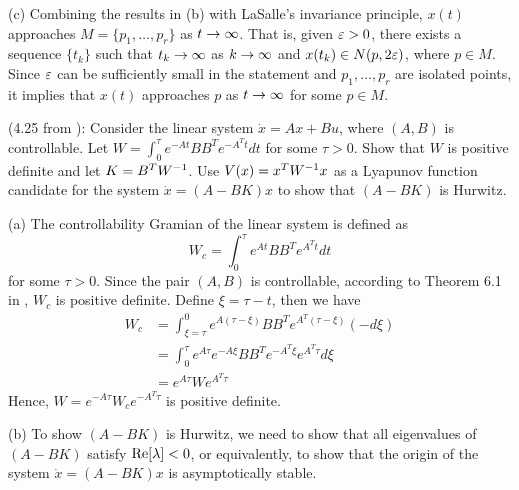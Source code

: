 \documentclass[a4 paper, 12pt]{article}
\begin{document}
(c) Combining the results in (b) with LaSalle's invariance principle, $x(t)$ approaches $M=\{p_1,\dots,p_r\}$ as $t\rightarrow\infty$. That is, given $\varepsilon>0$, there exists a sequence $\{t_k\}$ such that $t_k\rightarrow\infty$ as $k\rightarrow\infty$ and $x(t_k) \in N(p,2\varepsilon)$, where $p \in M$. Since $\varepsilon$ can be sufficiently small in the statement and $p_1,\dots,p_r$ are isolated points, it implies that $x(t)$ approaches $p$ as $t\rightarrow\infty$ for some $p\in M$.



\vspace{3em}
(4.25 from \cite{c1}): Consider the linear system $\dot{x} = Ax+Bu$, where $(A,B)$ is controllable. Let $W = \int_0^\tau e^{-At}BB^Te^{-A^Tt}dt$ for some $\tau>0$. Show that $W$ is positive definite and let $K = B^TW^{-1}$. Use $V(x) = x^TW^{-1}x$ as a Lyapunov function candidate for the system $\dot{x} = (A-BK)x$ to show that $(A-BK)$ is Hurwitz.

 (a) The controllability Gramian of the linear system is defined as 
\begin{equation}\label{eq:Gramian}
        W_c = \int_0^\tau e^{At}BB^Te^{A^Tt}dt
\end{equation}
for some $\tau>0$. Since the pair $(A,B)$ is controllable, according to Theorem 6.1 in \cite{c2}, $W_c$ is positive definite. Define $\xi = \tau-t$, then we have 
\begin{equation}
        \begin{aligned}
                W_c &= \int_{\xi=\tau}^0 e^{A(\tau-\xi)}BB^Te^{A^T(\tau-\xi)}(-d\xi)    \\
                &= \int_0^\tau e^{A\tau}e^{-A\xi}BB^Te^{-A^T\xi}e^{A^T\tau}d\xi \\
                &= e^{A\tau}We^{A^T\tau}
        \end{aligned}
\end{equation}
Hence, $W = e^{-A\tau}W_ce^{-A^T\tau}$ is positive definite.

(b) To show $(A-BK)$ is Hurwitz, we need to show that all eigenvalues of $(A-BK)$ satisfy $\textnormal{Re}[\lambda]<0$, or equivalently, to show that the origin of the system $\dot{x}=(A-BK)x$ is asymptotically stable. 
\end{document}
